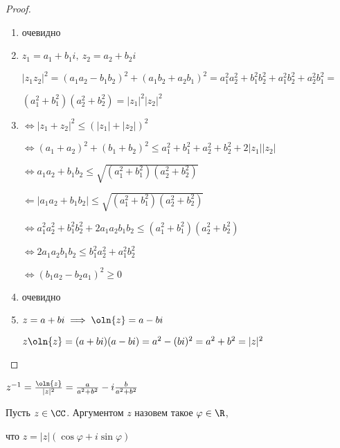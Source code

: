 \begin{proof}
    \begin{enumerate}
        \item очевидно
        
        \item $z_1 = a_1 + b_1i,~z_2 = a_2 + b_2i$
        
        $|z_1 z_2|^2 = (a_1 a_2 - b_1 b_2)^2 + (a_1 b_2 + a_2 b_1)^2 = a_1^2 a_2^2 + b_1^2 b_2^2 + a_1^2 b_2^2 + a_2^2 b_1^2 = $
        
        $(a_1^2 + b_1^2)(a_2^2 + b_2^2) = |z_1|^2|z_2|^2$
        
        \item $\iff |z_1 + z_2|^2 \leq (|z_1| + |z_2|)^2$
        
        $\iff (a_1 + a_2)^2 + (b_1 + b_2)^2 \leq a_1^2 + b_1^2 + a_2^2 + b_2^2 + 2|z_1||z_2|$
        
        $\iff a_1a_2 + b_1b_2 \leq \sqrt{(a_1^2 + b_1^2)(a_2^2 + b_2^2)}$
        
        $\Leftarrow |a_1 a_2 + b_1 b_2| \leq \sqrt{(a_1^2 + b_1^2)(a_2^2 + b_2^2)}$
        
        $\iff a_1^2 a_2^2 + b_1^2 b_2^2 + 2a_1a_2b_1b_2 \leq (a_1^2 + b_1^2)(a_2^2 + b_2^2)$
        
        $\iff 2a_1a_2b_1b_2 \leq b_1^2 a_2^2 + a_1^2 b_2^2$
        
        $\iff (b_1 a_2 - b_2 a_1)^2 \geq 0$

        \item очевидно
        
        \item $z = a + bi \implies \oln{z} = a - bi$
        
        $z \oln{z} = (a + bi)(a - bi) = a^2 - (bi)^2 = a^2 + b^2 = |z|^2$
    \end{enumerate}
\end{proof}

\begin{notice}
    $z^{-1} = \frac{\oln{z}}{|z|^2} = \frac{a}{a^2 + b^2} - i\frac{b}{a^2 + b^2}$
\end{notice}

\begin{defn}

    Пусть $z \in \CC$. Аргументом $z$ назовем такое $\varphi \in \R$, 

    что $z = |z|(\cos\varphi + i\sin\varphi)$
\end{defn}

